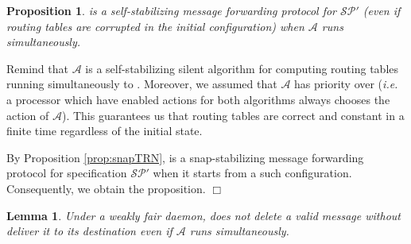 \documentclass[11pt]{article}
\newtheorem{lemma}{Lemma}
\newtheorem{proposition}{Proposition}
\newenvironment{proof}{{\noindent\bf Proof. } }{{\hfill $\Box$}}
\begin{document}
\begin{proposition} \label{prop:selfN}
\AN is a self-stabilizing message forwarding protocol for $\mathcal{SP}'$ (even if routing tables are corrupted in the initial configuration) when $\mathcal{A}$ runs simultaneously.
\end{proposition}

\begin{proof}
Remind that $\mathcal{A}$ is a self-stabilizing silent algorithm for computing routing tables running simultaneously to \AN. Moreover, we assumed that $\mathcal{A}$ has priority over \AN (\emph{i.e.} a processor which have enabled actions for both algorithms always chooses the action of $\mathcal{A}$). This guarantees us that routing tables are correct and constant in a finite time regardless of the initial state. 

By Proposition \ref{prop:snapTRN}, \AN is a snap-stabilizing message forwarding protocol for specification $\mathcal{SP}'$ when it starts from a such configuration. Consequently, we obtain the proposition.
\end{proof}

\begin{lemma} \label{lem:perteN}
Under a weakly fair daemon, \AN does not delete a valid message without deliver it to its destination even if $\mathcal{A}$ runs simultaneously.
\end{lemma}
\end{document}
